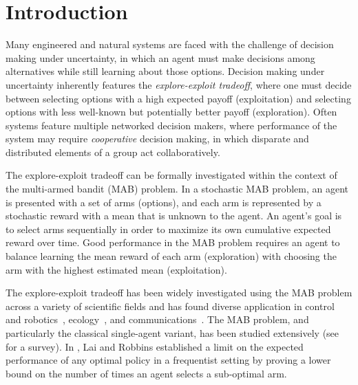 \documentclass[final,5p,times,twocolumn]{elsarticle}
\theoremstyle{definition}
\begin{document}
\section{Introduction}
Many engineered and natural systems are faced with the challenge of decision making under uncertainty, in which an agent must make decisions among alternatives while still learning about those options.  Decision making under uncertainty inherently features the \emph{explore-exploit tradeoff}, where one must decide between selecting options with a high expected payoff (exploitation) and selecting options with less well-known but potentially better payoff (exploration).   Often systems feature multiple networked decision makers, where performance of the system may require \emph{cooperative} decision making, in which disparate and distributed elements of a group act collaboratively.


The explore-exploit tradeoff {can be} formally investigated {within the context of} the multi-armed bandit (MAB) problem.  In a stochastic MAB problem, an agent is presented with a set of arms (options), and each arm is represented by a stochastic reward with a mean that is unknown to the agent.  An agent's goal is to select arms sequentially in order to maximize its own cumulative expected reward over time.  Good performance in the MAB problem requires an agent to balance learning the mean reward of each arm (exploration) with choosing the arm with the highest estimated mean (exploitation).  

The explore-exploit tradeoff has been widely investigated using the MAB problem across a variety of scientific fields and has found diverse application in control and robotics~\cite{VS-PR-NEL:14, MYC-JL-FSH:13},  ecology~\cite{JRK-AK-PT:78, VS-PR-NEL:13}, and communications~\cite{anandkumar2011distributed}. The MAB problem, and particularly the classical single-agent variant, has been studied extensively (see~\cite{SB-NCB:12} for a survey).  In \cite{lai1985asymptotically}, Lai and Robbins established a limit on the expected performance of any optimal policy in a frequentist setting by proving a lower bound on the number of times an agent selects a sub-optimal arm.  
\end{document}
